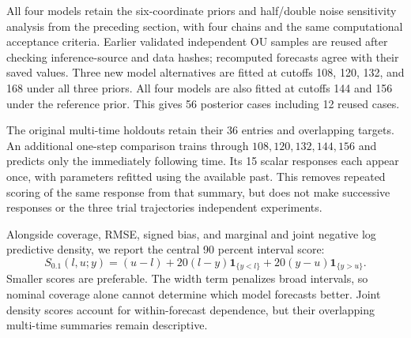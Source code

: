     All four models retain the six-coordinate priors and half/double noise
    sensitivity analysis from the preceding section, with four chains and
    the same computational acceptance criteria. Earlier validated independent
    OU samples are reused after checking inference-source and data hashes;
    recomputed forecasts agree with their saved values. Three new model
    alternatives are fitted at cutoffs 108, 120, 132, and 168 under all three
    priors. All four models are also fitted at cutoffs 144 and 156 under the
    reference prior. This gives 56 posterior cases including 12 reused cases.

    The original multi-time holdouts retain their 36 entries and overlapping
    targets. An additional one-step comparison trains through
    \(108,120,132,144,156\) and predicts only the immediately following
    time. Its 15 scalar responses each appear once, with parameters refitted
    using the available past. This removes repeated scoring of the same
    response from that summary, but does not make successive responses or
    the three trial trajectories independent experiments.

    Alongside coverage, RMSE, signed bias, and marginal and joint negative
    log predictive density, we report the central 90 percent interval score:
    \[
        S_{0.1}(l,u;y)=(u-l)
        +20(l-y)\boldsymbol 1_{\{y<l\}}
        +20(y-u)\boldsymbol 1_{\{y>u\}}.
    \]
    Smaller scores are preferable. The width term penalizes broad intervals,
    so nominal coverage alone cannot determine which model forecasts better.
    Joint density scores account for within-forecast dependence, but their
    overlapping multi-time summaries remain descriptive.



